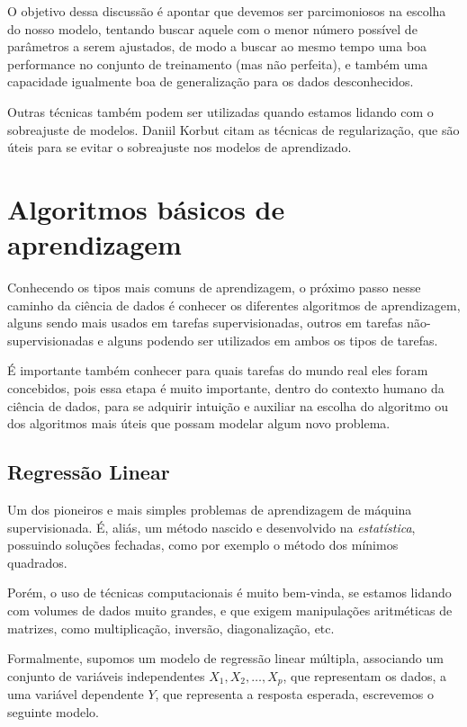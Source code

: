 O objetivo dessa discussão é apontar que devemos ser parcimoniosos na escolha do nosso modelo, tentando buscar aquele com o menor número possível de parâmetros a serem ajustados, de modo a buscar ao mesmo tempo uma boa performance no conjunto de treinamento (mas não perfeita), e também uma capacidade igualmente boa de generalização para os dados desconhecidos.

Outras técnicas também podem ser utilizadas quando estamos lidando com o sobreajuste de modelos. Daniil Korbut \citep{korbut} citam as técnicas de regularização, que são úteis para se evitar o sobreajuste nos modelos de aprendizado.

\section{Algoritmos básicos de aprendizagem}

Conhecendo os tipos mais comuns de aprendizagem, o próximo passo nesse caminho da ciência de dados é conhecer os diferentes algoritmos de aprendizagem, alguns sendo mais usados em tarefas supervisionadas, outros em tarefas não-supervisionadas e alguns podendo ser utilizados em ambos os tipos de tarefas.

É importante também conhecer para quais tarefas do mundo real eles foram concebidos, pois essa etapa é muito importante, dentro do contexto humano da ciência de dados, para se adquirir intuição e auxiliar na escolha do algoritmo ou dos algoritmos mais úteis que possam modelar algum novo problema.

\subsection{Regressão Linear}

Um dos pioneiros e mais simples problemas de aprendizagem de máquina supervisionada. É, aliás, um método nascido e desenvolvido na \emph{estatística}, possuindo soluções fechadas, como por exemplo o método dos mínimos quadrados. 

Porém, o uso de técnicas computacionais é muito bem-vinda, se estamos lidando com volumes de dados muito grandes, e que exigem manipulações aritméticas de matrizes, como multiplicação, inversão, diagonalização, etc.

Formalmente, supomos um modelo de regressão linear múltipla, associando um conjunto de variáveis independentes $X_1, X_2, \ldots, X_p$, que representam os dados, a uma variável dependente $Y$, que representa a resposta esperada, escrevemos o seguinte modelo.

